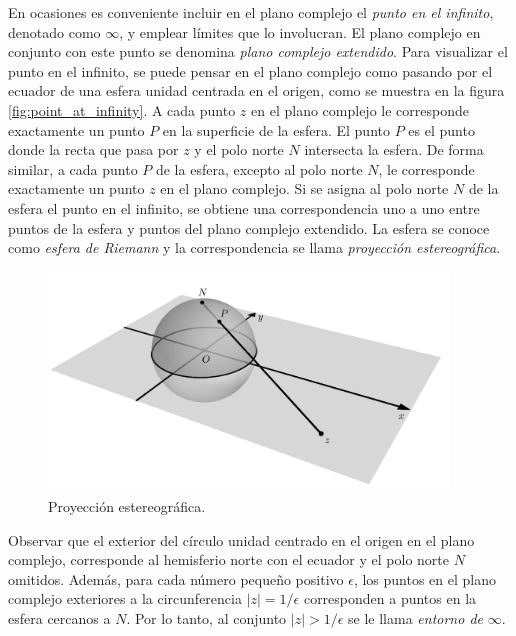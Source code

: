 \documentclass[a4paper]{report}
\begin{document}
En ocasiones es conveniente incluir en el plano complejo el \emph{punto en el infinito}, denotado como \(\infty\), y emplear límites que lo involucran. El plano complejo en conjunto con este punto se denomina \emph{plano complejo extendido}. Para visualizar el punto en el infinito, se puede pensar en el plano complejo como pasando por el ecuador de una esfera unidad centrada en el origen, como se muestra en la figura \ref{fig:point_at_infinity}. A cada punto \(z\) en el plano complejo le corresponde exactamente un punto \(P\) en la superficie de la esfera. El punto \(P\) es el punto donde la recta que pasa por \(z\) y el polo norte \(N\) intersecta la esfera. De forma similar, a cada punto \(P\) de la esfera, excepto al polo norte \(N\), le corresponde exactamente un punto \(z\)  en el plano complejo. Si se asigna al polo norte \(N\) de la esfera el punto en el infinito, se obtiene una correspondencia uno a uno entre puntos de la esfera y puntos del plano complejo extendido. La esfera se conoce como \emph{esfera de Riemann} y la correspondencia se llama \emph{proyección estereográfica}.
\begin{figure}[!htb]
 \begin{center}
 \includegraphics[width=0.95\textwidth]{figuras/point_at_infinity_mayavi_v2_resize.pdf}
 \caption{\label{fig:point_at_infinity_mayavi_v2_resize} Proyección estereográfica.}
 \end{center}
\end{figure}


Observar que el exterior del círculo unidad centrado en el origen en el plano complejo, corresponde al hemisferio norte con el ecuador y el polo norte \(N\) omitidos. Además, para cada número pequeño positivo \(\epsilon\), los puntos en el plano complejo exteriores a la circunferencia \(|z|=1/\epsilon\) corresponden a puntos en la esfera cercanos a \(N\). Por lo tanto, al conjunto \(|z|>1/\epsilon\) se le llama \emph{entorno de }\(\infty\).
\end{document}
